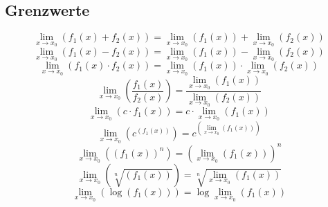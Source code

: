 \subsection{Grenzwerte}
\[ \boxed{\lim\limits_{x \to x_0}(f_1(x) + f_2(x)) 
= \lim\limits_{x \to x_0}(f_1(x)) + \lim\limits_{x \to x_0}(f_2(x))} \]
\[ \boxed{\lim\limits_{x \to x_0}(f_1(x) - f_2(x)) 
= \lim\limits_{x \to x_0}(f_1(x)) - \lim\limits_{x \to x_0}(f_2(x))} \]
\[ \boxed{\lim\limits_{x \to x_0}(f_1(x) \cdot f_2(x)) 
= \lim\limits_{x \to x_0}(f_1(x)) \cdot \lim\limits_{x \to x_0}(f_2(x))} \]
\[ \boxed{\lim\limits_{x \to x_0}\left(\frac{f_1(x)}{f_2(x)}\right) 
= \frac{\lim\limits_{x \to x_0}(f_1(x))}{\lim\limits_{x \to x_0}(f_2(x))}} \]
\[ \boxed{\lim\limits_{x \to x_0}(c \cdot f_1(x)) 
= c \cdot \lim\limits_{x \to x_0}(f_1(x))} \]
\[ \boxed{\lim\limits_{x \to x_0}\left(c^{(f_1(x))}\right) 
= c^{\left(\lim\limits_{x \to x_0}(f_1(x))\right)}} \]
\[ \boxed{\lim\limits_{x \to x_0}\left((f_1(x))^n\right) 
= \left(\lim\limits_{x \to x_0}(f_1(x))\right)^n} \]
\[ \boxed{\lim\limits_{x \to x_0}\left(\sqrt[n]{(f_1(x))}\right) 
= \sqrt[n]{\lim\limits_{x \to x_0}(f_1(x))}} \]
\[ \boxed{\lim\limits_{x \to x_0}\left(\log{(f_1(x))}\right) 
= \log{\lim\limits_{x \to x_0}(f_1(x))}} \]

